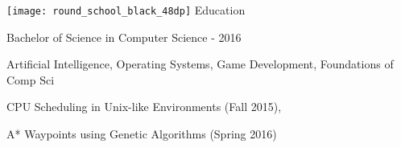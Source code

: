 {\noindent \texttt{[image: round\_school\_black\_48dp]} \hspace{0.25pc} \large Education}\hspace{1pc}{\noindent\rule{38pc}{0.4pt}}
\vspace{1pc}

 \hspace{9pc} {\large Bachelor of Science in Computer Science - 2016}

\vspace{1pc}
 {\small Artificial Intelligence, Operating Systems, Game Development, Foundations of Comp Sci}%

 {\small CPU Scheduling in Unix-like Environments (Fall 2015),
	
	\hspace{7.5pc}A* Waypoints using Genetic Algorithms (Spring 2016) }
\vspace{1pc}
